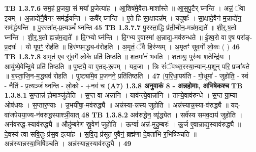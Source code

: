 \documentclass[17pt]{extarticle}
\begin{document}
                                \textbf{ TB 1.3.7.6} \newline
                  सम॒हं प्र॒जया॒ सं मया᳚ प्र॒जेत्या॑ह । आ॒शिष॑मे॒वैता-माशा᳚स्ते ॥ आ॒स॒पु॒टैर् घ्न॑न्ति । अन्नं॒ ॅवा इ॒यम् । अ॒न्नाद्ये॑नै॒वैनꣳ॒॒ सम॑र्द्धयन्ति । ऊषै᳚र् घ्नन्ति । ए॒ते हि सा॒क्षादन्न᳚म् । यदूषाः᳚ । सा॒क्षादे॒वैन॑-म॒न्नाद्ये॑न॒ सम॑र्द्धयन्ति ॥ पु॒रस्ता᳚त्-प्र॒त्यञ्चं᳚ घ्नन्ति \textbf{ 45} \newline
                  \newline
                                \textbf{ TB 1.3.7.7} \newline
                  पु॒रस्ता॒द्धि प्र॑ती॒चीन॒-मन्न॑म॒द्यते᳚ ॥ शी॒र्॒.ष॒तो घ्न॑न्ति । शी॒र्॒.ष॒तो ह्यन्न॑म॒द्यते᳚ ॥ दि॒ग्भ्यो घ्न॑न्ति । दि॒ग्भ्य ए॒वास्मा॑ अ॒न्नाद्य॒-मव॑रुन्धते ॥ ई॒श्व॒रो वा ए॒ष परा᳚ङ्-प्र॒दघः॑ । यो यूपꣳ॒॒ रोह॑ति ॥ हिर॑ण्यम॒द्ध्य-व॑रोहति । अ॒मृतं॒ ॅवै हिर॑ण्यम् । अ॒मृतꣳ॑ सुव॒र्गो लो॒कः ( ) \textbf{ 46} \newline
                  \newline
                                \textbf{ TB 1.3.7.8} \newline
                  अ॒मृत॑ ए॒व सु॑व॒र्गे लो॒के प्रति॑ तिष्ठति ॥ श॒तमा॑नं भवति । श॒तायुः॒ पुरु॑षः श॒तेन्द्रि॑यः । आयु॑ष्ये॒वेन्द्रि॒ये प्रति॑ तिष्ठति ॥ पुष्ट्यै॒ वा ए॒तद्-रू॒पम् । यद॒जा । त्रिः सं॑ॅवथ्स॒रस्या॒न्यान्-प॒शून् परि॒ प्रजा॑यते ॥ ब॒स्ता॒जि॒न-म॒द्ध्यव॑ रोहति । पुष्ट्या॑मे॒व प्र॒जन॑ने॒ प्रति॑तिष्ठति । \textbf{ 47} \newline
                  \newline
                                    (प॒रि॒धा॒पय॑ति - गो॒धूमा॑ - जुहोति॒ - स्वं - नैति॑ - प्र॒त्यञ्जं॑ घ्नन्ति - लो॒को - +नव॑ च \textbf{(A7)} \newline \newline
                \textbf{ 1.3.8      अनुवाकं   8 - अन्नहोमाः, अभिषेकश्च} \newline
                                \textbf{ TB 1.3.8.1} \newline
                  स॒प्तान्न॑-हो॒माञ्जु॑होति । स॒प्त वा अन्ना॑नि । याव॑न्त्ये॒वान्ना॑नि । तान्ये॒वाव॑रुन्धे । स॒प्त ग्रा॒म्या ओष॑धयः । स॒प्तार॒ण्याः । उ॒भयी॑षा॒-मव॑रुद्ध्यै ॥ अन्न॑स्या-न्नस्य जुहोति । अन्न॑स्यान्न॒स्या-व॑रुद्ध्यै ॥ यद्-वा॑जपेयया॒ज्य-न॑वरुद्धस्याश्ञी॒यात् \textbf{ 48} \newline
                  \newline
                                \textbf{ TB 1.3.8.2} \newline
                  अव॑रुद्धेन॒ व्यृ॑द्ध्येत । सर्व॑स्य समव॒दाय॑ जुहोति । अन॑वरुद्ध॒-स्याव॑रुद्ध्यै ॥ औदु॑म्बरेण स्रु॒वेण॑ जुहोति । ऊर्ग्वा अन्न॑-मुदु॒म्बरः॑ । ऊ॒र्ज ए॒वान्नाद्य॒स्याव॑रुद्ध्यै ॥ दे॒वस्य॑ त्वा सवि॒तुः प्र॑स॒व इत्या॑ह । स॒वि॒तृ प्र॑सूत ए॒वैनं॒ ब्रह्म॑णा दे॒वता॑भि-र॒भिषि॑ञ्चति ॥ अन्न॑स्यान्नस्या॒भिषि॑ञ्चति । अन्न॑स्यान्न॒स्याव॑रुद्ध्यै । \textbf{ 49} \newline
\end{document}
